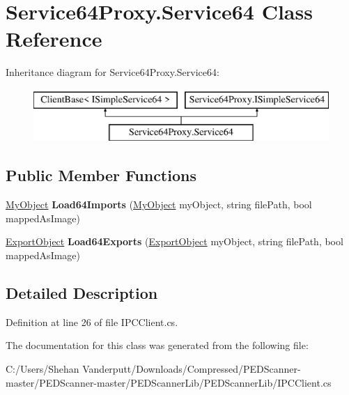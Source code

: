 \hypertarget{class_service64_proxy_1_1_service64}{}\section{Service64\+Proxy.\+Service64 Class Reference}
\label{class_service64_proxy_1_1_service64}
Inheritance diagram for Service64\+Proxy.\+Service64\+:\begin{figure}[H]
\begin{center}
\leavevmode
\includegraphics[height=2.000000cm]{class_service64_proxy_1_1_service64}
\end{center}
\end{figure}
\subsection*{Public Member Functions}
\begin{DoxyCompactItemize}
\item 
\mbox{\label{class_service64_proxy_1_1_service64_a0f8d3d06960796d729fb3abea0e978a8}} 
\mbox{\hyperlink{class_objects_1_1_my_object}{My\+Object}} {\bfseries Load64\+Imports} (\mbox{\hyperlink{class_objects_1_1_my_object}{My\+Object}} my\+Object, string file\+Path, bool mapped\+As\+Image)
\item 
\mbox{\label{class_service64_proxy_1_1_service64_a6cfaf78f933d791bbf393e87554d974f}} 
\mbox{\hyperlink{class_objects_1_1_export_object}{Export\+Object}} {\bfseries Load64\+Exports} (\mbox{\hyperlink{class_objects_1_1_export_object}{Export\+Object}} my\+Object, string file\+Path, bool mapped\+As\+Image)
\end{DoxyCompactItemize}


\subsection{Detailed Description}


Definition at line 26 of file I\+P\+C\+Client.\+cs.



The documentation for this class was generated from the following file\+:\begin{DoxyCompactItemize}
\item 
C\+:/\+Users/\+Shehan Vanderputt/\+Downloads/\+Compressed/\+P\+E\+D\+Scanner-\/master/\+P\+E\+D\+Scanner-\/master/\+P\+E\+D\+Scanner\+Lib/\+P\+E\+D\+Scanner\+Lib/I\+P\+C\+Client.\+cs\end{DoxyCompactItemize}
